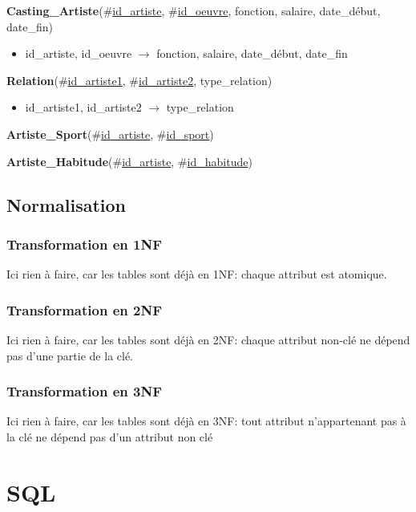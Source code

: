 \documentclass{article}
\begin{document}
\newpage
\noindent
\textbf{Casting\_Artiste}(\#\underline{id\_artiste}, \#\underline{id\_oeuvre}, fonction, salaire, date\_début, date\_fin)

\begin{itemize}
\item id\_artiste, id\_oeuvre $\rightarrow$ fonction, salaire, date\_début, date\_fin
\end{itemize}

\vspace{2mm}
\noindent
\textbf{Relation}(\#\underline{id\_artiste1}, \#\underline{id\_artiste2}, type\_relation)

\begin{itemize}
\item id\_artiste1, id\_artiste2 $\rightarrow$ type\_relation
\end{itemize}

\vspace{2mm}
\noindent
\textbf{Artiste\_Sport}(\#\underline{id\_artiste}, \#\underline{id\_sport})

\vspace{2mm}
\noindent
\textbf{Artiste\_Habitude}(\#\underline{id\_artiste}, \#\underline{id\_habitude})



\subsection{Normalisation}
\subsubsection*{Transformation en 1NF}
Ici rien à faire, car les tables sont déjà en 1NF: chaque attribut est
atomique.

\subsubsection*{Transformation en 2NF}
Ici rien à faire, car les tables sont déjà en 2NF: chaque attribut
non-clé ne dépend pas d'une partie de la clé.

\subsubsection*{Transformation en 3NF}
Ici rien à faire, car les tables sont déjà en 3NF:
tout attribut n'appartenant pas à la clé ne dépend pas d'un attribut non clé
\vspace{5mm}
\section{SQL}
\end{document}
